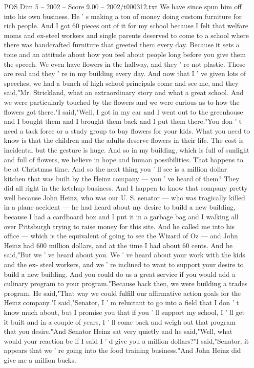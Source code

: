 \begin{textsample}{POS Dim 5 – 2002 – Score 9.00 – 2002/t000312.txt}
We have since spun him off into his own business.
He ' s making a ton of money doing custom furniture for rich people.
And I got 60 pieces out of it for my school because I felt that welfare moms and ex-steel workers and single parents deserved to come to a school where there was handcrafted furniture that greeted them every day.
Because it sets a tone and an attitude about how you feel about people long before you give them the speech.
We even have flowers in the hallway, and they ' re not plastic.
Those are real and they ' re in my building every day.
And now that I ' ve given lots of speeches, we had a bunch of high school principals come and see me, and they said,"Mr.
Strickland, what an extraordinary story and what a great school.
And we were particularly touched by the flowers and we were curious as to how the flowers got there."I said,"Well, I got in my car and I went out to the greenhouse and I bought them and I brought them back and I put them there."You don ' t need a task force or a study group to buy flowers for your kids.
What you need to know is that the children and the adults deserve flowers in their life.
The cost is incidental but the gesture is huge.
And so in my building, which is full of sunlight and full of flowers, we believe in hope and human possibilities.
That happens to be at Christmas time.
And so the next thing you ' ll see is a million dollar kitchen that was built by the Heinz company — you ' ve heard of them?
They did all right in the ketchup business.
And I happen to know that company pretty well because John Heinz, who was our U.
S. senator — who was tragically killed in a plane accident — he had heard about my desire to build a new building, because I had a cardboard box and I put it in a garbage bag and I walking all over Pittsburgh trying to raise money for this site.
And he called me into his office — which is the equivalent of going to see the Wizard of Oz — and John Heinz had 600 million dollars, and at the time I had about 60 cents.
And he said,"But we ' ve heard about you.
We ' ve heard about your work with the kids and the ex- steel workers, and we ' re inclined to want to support your desire to build a new building.
And you could do us a great service if you would add a culinary program to your program."Because back then, we were building a trades program.
He said,"That way we could fulfill our affirmative action goals for the Heinz company."I said,"Senator, I ' m reluctant to go into a field that I don ' t know much about, but I promise you that if you ' ll support my school, I ' ll get it built and in a couple of years, I ' ll come back and weigh out that program that you desire."And Senator Heinz sat very quietly and he said,"Well, what would your reaction be if I said I ' d give you a million dollars?"I said,"Senator, it appears that we ' re going into the food training business."And John Heinz did give me a million bucks.

\end{textsample}
